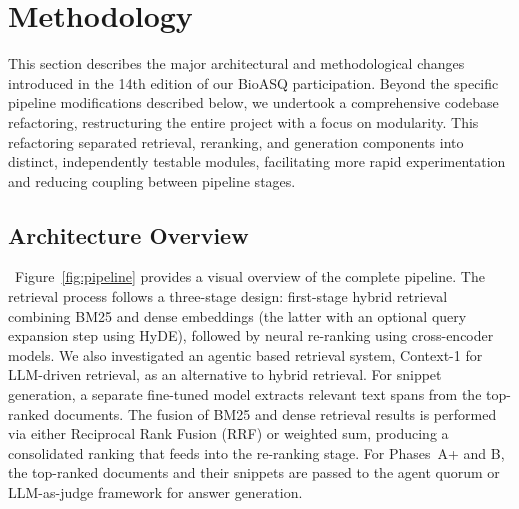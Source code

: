 \section{Methodology}
\label{sec:methodology}

This section describes the major architectural and methodological changes introduced in the 14th edition of our BioASQ participation. Beyond the specific pipeline modifications described below, we undertook a comprehensive codebase refactoring, restructuring the entire project with a focus on modularity. This refactoring separated retrieval, reranking, and generation components into distinct, independently testable modules, facilitating more rapid experimentation and reducing coupling between pipeline stages.

\subsection{Architecture Overview}

~Figure~\ref{fig:pipeline} provides a visual overview of the complete pipeline. The retrieval process follows a three-stage design: first-stage hybrid retrieval combining BM25 and dense embeddings (the latter with an optional query expansion step using HyDE), followed by neural re-ranking using cross-encoder models. We also investigated an agentic based retrieval system, Context-1 \cite{context1} for LLM-driven retrieval, as an alternative to hybrid retrieval. For snippet generation, a separate fine-tuned model extracts relevant text spans from the top-ranked documents. The fusion of BM25 and dense retrieval results is performed via either Reciprocal Rank Fusion (RRF) or weighted sum, producing a consolidated ranking that feeds into the re-ranking stage. For Phases~A+ and B, the top-ranked documents and their snippets are passed to the agent quorum or LLM-as-judge framework for answer generation.


